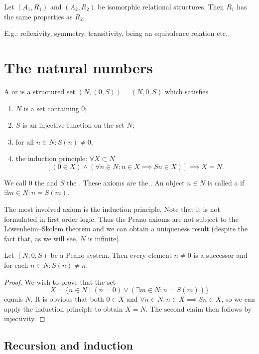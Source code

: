 \begin{lemma}
Let $(A_1, R_1)$ and $(A_2, R_2)$ be isomorphic relational structures. Then $R_1$ has the same properties as $R_2$.
\end{lemma}
E.g.: reflexivity, symmetry, transitivity, being an equivalence relation etc.


\chapter{The natural numbers}
\begin{definition}
A  or  is a structured set $(N,(0,S)) = (N,0,S)$ which satisfies
\begin{enumerate}
\item $N$ is a set containing $0$;
\item $S$ is an injective function on the set $N$;
\item for all $n\in N: S(n) \neq 0$;
\item the induction principle: $\forall X\subset N$
\[ [(0\in X) \land (\forall n\in N: n\in X \implies Sn \in X)] \implies X = N. \]
\end{enumerate}
We call $0$ the  and $S$ the . These axioms are the . An object $n\in N$ is called a  if $\exists m\in N: n = S(m)$.
\end{definition}
The most involved axiom is the induction principle. Note that it is not formulated in first order logic. Thus the Peano axioms are not subject to the Löwenheim–Skolem theorem and we can obtain a uniqueness result (despite the fact that, as we will see, $N$ is infinite).

\begin{lemma} \label{lemma:successor}
Let $(N,0,S)$ be a Peano system. Then every element $n\neq 0$ is a successor and for each $n\in N: S(n) \neq n$.
\end{lemma}
\begin{proof}
We wish to prove that the set
\[ X = \{n\in N\;|\; (n=0)\lor(\exists m\in N: n = S(m))\} \]
equals $N$. It is obvious that both $0\in X$ and $\forall n\in N: n\in X \implies Sn \in X$, so we can apply the induction principle to obtain $X=N$. The second claim then follows by injectivity.
\end{proof}
\section{Recursion and induction}
